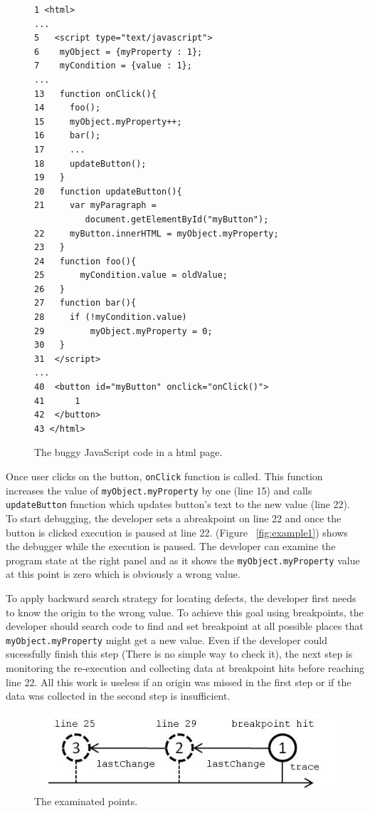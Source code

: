 \documentclass[preprint]{sigplanconf}
\begin{document}
\begin{figure}[htp]
\begin{verbatim}
1 <html>
...
5   <script type="text/javascript">
6    myObject = {myProperty : 1};
7    myCondition = {value : 1};
...
13   function onClick(){
14     foo();
15     myObject.myProperty++;
16     bar();
17     ...
18     updateButton();
19   }
20   function updateButton(){
21     var myParagraph =
          document.getElementById("myButton");
22     myButton.innerHTML = myObject.myProperty;
23   }   
24   function foo(){
25  	 myCondition.value = oldValue;
26   }  
27   function bar(){ 
28     if (!myCondition.value)
29         myObject.myProperty = 0;
30   }
31  </script> 
...
40  <button id="myButton" onclick="onClick()">
41  	1 
42  </button>
43 </html>
\end{verbatim}
\caption{The buggy JavaScript code in a html page.}
\label{fig:js-code}
\end{figure}

Once user clicks on the button, \texttt{onClick} function is called. This function increases the value of \texttt{myObject.myProperty} by one (line 15) and calls \texttt{updateButton} function which updates button's text to the new value (line 22). To start debugging, the developer sets a abreakpoint on line 22 and once the button is clicked execution is paused at line 22. (Figure ~\ref{fig:example1}) shows the debugger while the execution is paused. The developer can examine the program state at the right panel and as it shows the \texttt{myObject.myProperty} value at this point is zero which is obviously a wrong value. 

To apply backward search strategy for locating defects, the developer first needs to know the origin to the wrong value. To achieve this goal using breakpoints, the developer should search code to find and set breakpoint at all possible places that \texttt{myObject.myProperty} might get a new value. Even if the developer could sucessfully finish this step (There is no simple way to check it), the next step is monitoring the re-execution and collecting data at breakpoint hits before reaching line 22. All this work is useless if an origin was missed in the first step or if the data was collected in the second step is insufficient.


\begin{figure}[htp]
\includegraphics{5-example-points.jpg}
\caption{The examinated points.}
\label{fig:example-points}
\end{figure}
\end{document}
